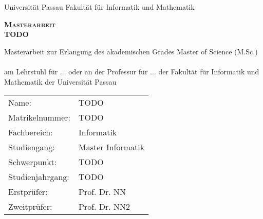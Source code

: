 \begin{titlepage}
	Universität Passau\newline
	Fakultät für Informatik und Mathematik
	\vspace{2.5cm}
    \begin{center}
    \LARGE\textbf{\textsc{Masterarbeit}}\\
    \vspace{1cm}
    \huge \textbf{\textsf{TODO}} \\
    \vspace{1cm}
    \normalsize

    \vspace{2.5cm}
    \end{center}

 \normalsize{
 	Masterarbeit zur Erlangung des akademischen Grades\newline
 	Master of Science (M.Sc.)\newline
 	\ \\
 	am Lehrstuhl für ... oder an der Professur für ... \newline
 	der Fakultät für Informatik und Mathematik\newline
 	der Universität Passau\newline

    \begin{tabular}{ll}
    	Name: & TODO \\
    	Matrikelnummer: & TODO \\
    	Fachbereich: & Informatik\\
    	Studiengang: & Master Informatik\\
    	Schwerpunkt: & TODO \\
    	Studienjahrgang: & TODO \\
	Erstprüfer: & Prof. Dr. NN \\
	Zweitprüfer: & Prof. Dr. NN2 \\
    \end{tabular}\\
    }


\end{titlepage}
